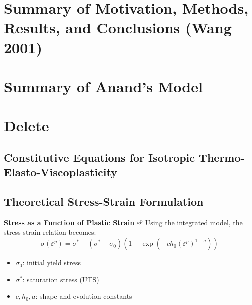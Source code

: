 \documentclass[11pt]{article}
\begin{document}
\section*{Summary of Motivation, Methods, Results, and Conclusions (Wang 2001)}
\label{sec:org20bd1c4}


\section*{Summary of Anand’s Model}
\label{sec:org0e71214}





\section*{Delete}
\label{sec:org67b04ad}



\subsection*{Constitutive Equations for Isotropic Thermo-Elasto-Viscoplasticity}
\label{sec:orgd461da4}


\subsection*{Theoretical Stress-Strain Formulation}
\label{sec:orgedc460e}
\textbf{Stress as a Function of Plastic Strain} \(\varepsilon^p\)
Using the integrated model, the stress-strain relation becomes:
\[
\sigma(\varepsilon^p) = \sigma^* - (\sigma^* - \sigma_0)(1 - \exp(-ch_0 (\varepsilon^p)^{1-a}))
\]
\begin{itemize}
\item \(\sigma_0\): initial yield stress
\item \(\sigma^*\): saturation stress (UTS)
\item \(c, h_0, a\): shape and evolution constants
\end{itemize}
\end{document}
